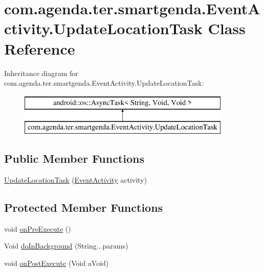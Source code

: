 \hypertarget{classcom_1_1agenda_1_1ter_1_1smartgenda_1_1_event_activity_1_1_update_location_task}{\section{com.\-agenda.\-ter.\-smartgenda.\-Event\-Activity.\-Update\-Location\-Task Class Reference}
\label{classcom_1_1agenda_1_1ter_1_1smartgenda_1_1_event_activity_1_1_update_location_task}
}
Inheritance diagram for com.\-agenda.\-ter.\-smartgenda.\-Event\-Activity.\-Update\-Location\-Task\-:\begin{figure}[H]
\begin{center}
\leavevmode
\includegraphics[height=2.000000cm]{classcom_1_1agenda_1_1ter_1_1smartgenda_1_1_event_activity_1_1_update_location_task}
\end{center}
\end{figure}
\subsection*{Public Member Functions}
\begin{DoxyCompactItemize}
\item 
\hyperlink{classcom_1_1agenda_1_1ter_1_1smartgenda_1_1_event_activity_1_1_update_location_task_ad8a2a567d86948d19c2b5a1d2b9c23fb}{Update\-Location\-Task} (\hyperlink{classcom_1_1agenda_1_1ter_1_1smartgenda_1_1_event_activity}{Event\-Activity} activity)
\end{DoxyCompactItemize}
\subsection*{Protected Member Functions}
\begin{DoxyCompactItemize}
\item 
void \hyperlink{classcom_1_1agenda_1_1ter_1_1smartgenda_1_1_event_activity_1_1_update_location_task_a1d82dccbb977f7669b2e12775403267b}{on\-Pre\-Execute} ()
\item 
Void \hyperlink{classcom_1_1agenda_1_1ter_1_1smartgenda_1_1_event_activity_1_1_update_location_task_a17d91ee9080db2bf7d7edef797441f36}{do\-In\-Background} (String...\-params)
\item 
void \hyperlink{classcom_1_1agenda_1_1ter_1_1smartgenda_1_1_event_activity_1_1_update_location_task_ad8d503185607e37c23b1de86673c9bd2}{on\-Post\-Execute} (Void a\-Void)
\end{DoxyCompactItemize}


